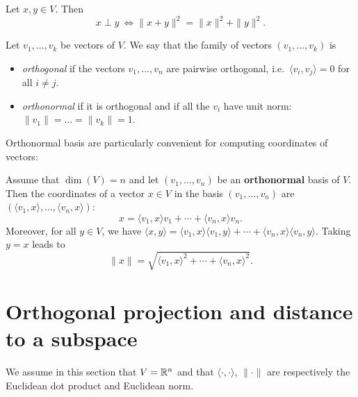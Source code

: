 \documentclass[11pt,nocut]{article}
\begin{document}

\begin{theorem}
	Let $x,y \in V$. Then
	$$
	x \perp y \ \Longleftrightarrow \|x+y\|^2 = \|x\|^2 + \|y\|^2.
	$$
\end{theorem}


\begin{definition}
	Let $v_1, \dots, v_k$ be vectors of $V$. We say that the family of vectors $(v_1, \dots, v_k)$ is
	\begin{itemize}
		\item \emph{orthogonal} if the vectors $v_1, \dots, v_n$ are pairwise orthogonal, i.e.\ $\langle v_i, v_j \rangle = 0$ for all $i \neq j$.
		\item \emph{orthonormal} if it is orthogonal and if all the $v_i$ have unit norm: $\|v_1\| = \dots = \|v_k\| = 1$.
	\end{itemize}
\end{definition}

Orthonormal basis are particularly convenient for computing coordinates of vectors:

\begin{proposition}\label{prop:coords}
	Assume that $\dim(V)=n$ and let $(v_1, \dots, v_n)$ be an \textbf{orthonormal} basis of $V$. Then the coordinates of a vector $x \in V$ in the basis $(v_1, \dots, v_n)$ are $(\langle v_1, x\rangle, \dots, \langle v_n,x \rangle)$:
	$$
	x = \langle v_1, x \rangle v_1 + \cdots + \langle v_n, x \rangle v_n.
	$$
	Moreover, for all $y \in V$, we have $\langle x,y \rangle = \langle v_1,x\rangle\langle v_1,y\rangle + \cdots + \langle v_n,x\rangle\langle v_n,y\rangle$. Taking $y=x$ leads to
	$$
	\|x\| = \sqrt{\langle v_1, x \rangle^2 + \cdots + \langle v_n, x \rangle^2}.
	$$
\end{proposition}

\section{Orthogonal projection and distance to a subspace}

We assume in this section that $V = \mathbb{R}^n$ and that $\langle \cdot, \cdot \rangle$, $\| \cdot \|$ are respectively the Euclidean dot product and Euclidean norm.
\end{document}
